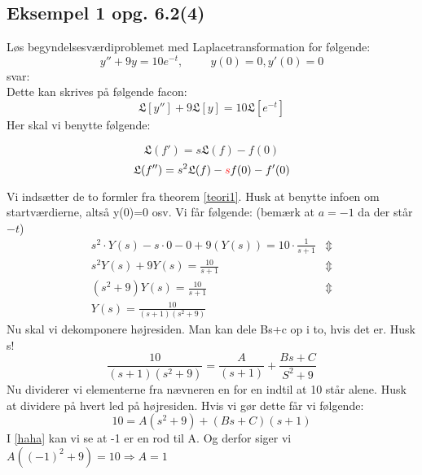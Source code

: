 \documentclass[11pt,fleqn]{book} %
\begin{document}
\subsection{Eksempel 1 opg. 6.2(4)}
Løs begyndelsesværdiproblemet  med Laplacetransformation for følgende:
\begin{equation}
y''+9y=10e^{-t}, \hspace{1cm} y(0)=0, y'(0)=0
\end{equation}
svar:\\
Dette kan skrives på følgende facon:
\begin{equation}
\mathfrak{L}[y'']+9\mathfrak{L}[y]=10\mathfrak{L}[e^{-t}]
\end{equation}
Her skal vi benytte følgende:
\begin{theorem} \label{teori1}
\begin{equation}
\mathfrak{L}(f')=s\mathfrak{L}(f)-f(0)
\end{equation}
\begin{equation}
\mathfrak{L}(f'')=s^2 \mathfrak{L}(f)-\textcolor{red}{s}f(0)-f'(0)
\end{equation}
\end{theorem}
Vi indsætter de to formler fra theorem \ref{teori1}. Husk at benytte infoen om startværdierne, altså y(0)=0 osv. Vi får følgende: (bemærk at $a=-1$ da der står $-t$)
\begin{equation}
\begin{split}
s^2\cdot Y(s)-s\cdot 0 - 0 +9(Y(s))  =10 \cdot \frac{1}{s+1}&  \Updownarrow\\
 s^2Y(s)+9Y(s)=\frac{10}{s+1}& \Updownarrow\\
 (s^2+9)Y(s)=\frac{10}{s+1} & \Updownarrow\\
 Y(s)= \frac{10}{(s+1)(s^2+9)}
\end{split}
\end{equation}
Nu skal vi dekomponere højresiden. Man kan dele Bs+c op i to, hvis det er. Husk s!
\begin{equation}\label{haha}
\frac{10}{(s+1)(s^2+9)}=\frac{A}{(s+1)}+\frac{Bs+C}{S^2+9}
\end{equation}
Nu dividerer vi elementerne fra nævneren en for en indtil at 10 står alene. Husk at dividere på hvert led på højresiden. Hvis vi gør dette får vi følgende:
\begin{equation}\label{husks}
10=A(s^2+9)+(Bs+C)(s+1)
\end{equation}
I \ref{haha} kan vi se at -1 er en rod til A.  Og derfor siger vi $A((-1)^2+9)=10 \Rightarrow A=1$ \\\\
\end{document}
